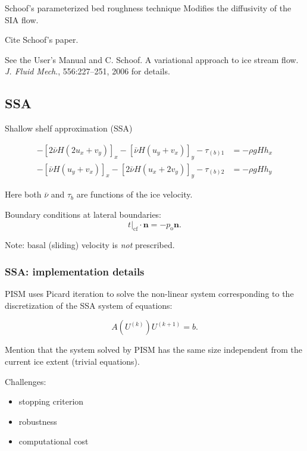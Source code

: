 \documentclass[hide notes,intlimits]{beamer}
\begin{document}
\begin{frame}{Schoof's parameterized bed roughness technique}
  Modifies the diffusivity of the SIA flow.

  Cite Schoof's paper.

  See the User's Manual and C. Schoof. A variational approach to ice
  stream flow. \emph{J. Fluid Mech}., 556:227–251, 2006 for details.
\end{frame}

\subsection{SSA}
\label{sec:ssa}

\begin{frame}{Shallow shelf approximation (SSA)}

  \begin{align}
    -\left[ 2\bar\nu H\left( 2u_{x} + v_{y}\right)\right]_{x} - \left[\bar\nu
    H\left(u_{y}+v_{x} \right) \right]_{y} - \tau_{(b)1} &= - \rho gH h_{x} \\
    -\left[ \bar\nu H\left( u_{y} + v_{x} \right)\right]_{x} - \left[2\bar\nu
    H\left(u_{x}+2v_{y}  \right) \right]_{y} - \tau_{(b)2} &= -\rho gH h_{y}
  \end{align}

  Here both $\bar \nu$ and $\tau_{b}$ are functions of the ice velocity.

  Boundary conditions at lateral boundaries:
  \begin{equation}
    \label{eq:5}
    \left.t\right|_{\text{cf}} \cdot \mathbf{n} = -p_{\text{o}} \mathbf{n}.
  \end{equation}

  Note: basal (sliding) velocity is \emph{not} prescribed.

\end{frame}


\begin{frame}
  \frametitle{SSA: implementation details}

  PISM uses Picard iteration to solve the non-linear system
  corresponding to the discretization of the SSA system of equations:

  \begin{equation}
    \label{eq:4}
    A(U^{(k)}) U^{(k+1)} = b.
  \end{equation}

  Mention that the system solved by PISM has the same size independent
  from the current ice extent (trivial equations).

  Challenges:
  \begin{itemize}
  \item stopping criterion
  \item robustness
  \item computational cost
  \end{itemize}
\end{frame}
\end{document}

